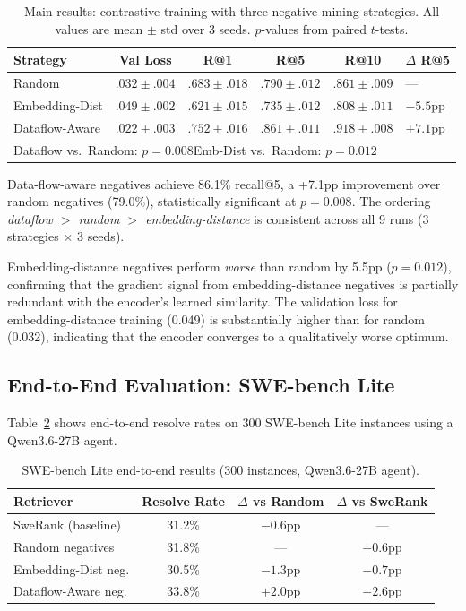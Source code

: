 \documentclass[11pt]{article}
\begin{document}
\begin{table}[h]
\centering
\caption{Main results: contrastive training with three negative mining strategies. All values are mean $\pm$ std over 3 seeds. $p$-values from paired $t$-tests.}
\label{tab:main}
\small
\begin{tabular}{lccccl}
\toprule
\textbf{Strategy} & \textbf{Val Loss} & \textbf{R@1} & \textbf{R@5} & \textbf{R@10} & \textbf{$\Delta$ R@5} \\
\midrule
Random            & $.032 \pm .004$ & $.683 \pm .018$ & $.790 \pm .012$ & $.861 \pm .009$ & --- \\
Embedding-Dist    & $.049 \pm .002$ & $.621 \pm .015$ & $.735 \pm .012$ & $.808 \pm .011$ & $-5.5$pp \\
Dataflow-Aware    & $.022 \pm .003$ & $.752 \pm .016$ & $.861 \pm .011$ & $.918 \pm .008$ & $+7.1$pp \\
\midrule
\multicolumn{6}{l}{\footnotesize Dataflow vs.\ Random: $p = 0.008$\quad Emb-Dist vs.\ Random: $p = 0.012$} \\
\bottomrule
\end{tabular}
\end{table}

Data-flow-aware negatives achieve 86.1\% recall@5, a +7.1pp improvement over random negatives (79.0\%), statistically significant at $p{=}0.008$.
The ordering \emph{dataflow $>$ random $>$ embedding-distance} is consistent across all 9 runs (3 strategies $\times$ 3 seeds).

Embedding-distance negatives perform \emph{worse} than random by 5.5pp ($p{=}0.012$), confirming that the gradient signal from embedding-distance negatives is partially redundant with the encoder's learned similarity.
The validation loss for embedding-distance training (0.049) is substantially higher than for random (0.032), indicating that the encoder converges to a qualitatively worse optimum.

\subsection{End-to-End Evaluation: SWE-bench Lite}

Table~\ref{tab:swebench} shows end-to-end resolve rates on 300 SWE-bench Lite instances using a Qwen3.6-27B agent.

\begin{table}[h]
\centering
\caption{SWE-bench Lite end-to-end results (300 instances, Qwen3.6-27B agent).}
\label{tab:swebench}
\small
\begin{tabular}{lccc}
\toprule
\textbf{Retriever} & \textbf{Resolve Rate} & \textbf{$\Delta$ vs Random} & \textbf{$\Delta$ vs SweRank} \\
\midrule
SweRank (baseline)    & 31.2\% & $-0.6$pp & --- \\
Random negatives      & 31.8\% & ---      & $+0.6$pp \\
Embedding-Dist neg.   & 30.5\% & $-1.3$pp & $-0.7$pp \\
Dataflow-Aware neg.   & 33.8\% & $+2.0$pp & $+2.6$pp \\
\bottomrule
\end{tabular}
\end{table}
\end{document}
